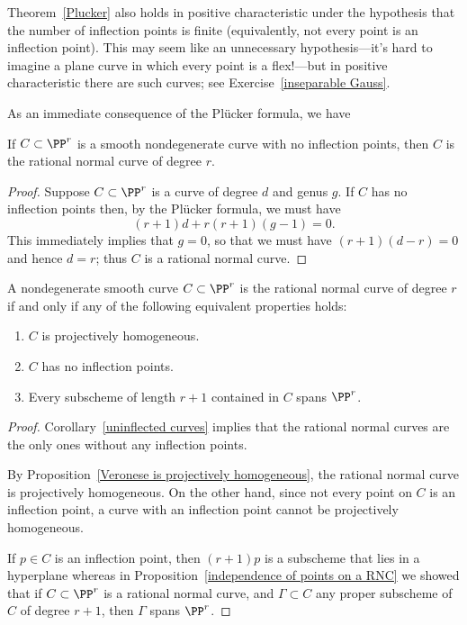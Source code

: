 Theorem~\ref{Plucker} also holds in positive characteristic under the hypothesis that the number of inflection points is finite (equivalently, not every point is an inflection point). This may seem like an unnecessary hypothesis---it's hard to imagine a plane curve in which every point is a flex!---but in positive characteristic there are such curves; see Exercise~\ref{inseparable Gauss}.

As an immediate consequence of the Pl\"ucker formula, we have

\begin{corollary}\label{uninflected curves}
 If $C\subset \PP^r$ is a smooth nondegenerate curve with no inflection points, then $C$ is the rational normal curve of degree $r$. 
\end{corollary}

\begin{proof}
Suppose $C \subset \PP^r$ is a curve of degree $d$ and genus $g$. If $C$ has no inflection points then, by the Pl\"ucker formula, we must have
$$
(r+1)d + r(r+1)(g-1) = 0.
$$
This immediately implies that $g=0$, so that we must have $(r+1)(d-r) = 0$ and hence $d=r$; thus $C$ is a rational normal curve.
\end{proof}

\begin{corollary}
A nondegenerate smooth  curve $C\subset \PP^{r}$ is the rational normal curve
of degree $r$ if and only if any of the following equivalent properties holds:
\begin{enumerate}
 \item $C$ is projectively homogeneous.
 \item $C$ has no inflection points.
 \item Every subscheme of length $r+1$ contained in $C$ spans $\PP^{r}$.
\end{enumerate}
\end{corollary}

\begin{proof}
Corollary~\ref{uninflected curves} implies that the
rational normal curves are the only ones without any inflection points.

By Proposition~\ref{Veronese is projectively homogeneous}, the rational normal curve 
is projectively homogeneous. On the other hand, since not every point on $C$ is an inflection point, a curve with an inflection point cannot be projectively homogeneous.

If $p \in C$ is an inflection point, then $(r+1)p$ is  a subscheme that lies in a hyperplane
whereas in Proposition~\ref{independence of points on a RNC} we showed that if $C \subset \PP^r$ is a rational normal curve, and $\Gamma \subset C$ any proper subscheme of $C$ of degree $r+1$, then $\Gamma$ spans $\PP^r$. 
\end{proof}

